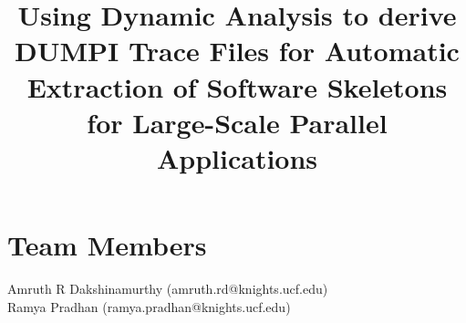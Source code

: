 \documentclass[preprint, cm, 10pt]{sigplanconf}
\begin{document}



\title{Using Dynamic Analysis to derive DUMPI Trace Files for Automatic Extraction of Software Skeletons for Large-Scale Parallel Applications }

\authorinfo{}


\maketitle


\section*{Team Members}
Amruth R Dakshinamurthy (amruth.rd@knights.ucf.edu) \\
Ramya Pradhan (ramya.pradhan@knights.ucf.edu)
\end{document}
